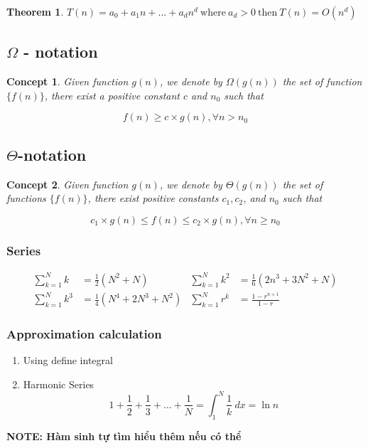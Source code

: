 \documentclass{article}
\newtheorem*{theorem}{Theorem}
\newtheorem*{concept}{Concept}
\begin{document}
    \begin{theorem}
        $T(n) = a_0 + a_1n + ... + a_d n^d \: \text{where} \: a_d > 0 \: \text{then} \: T(n) = O(n^d)$
    \end{theorem}

\subsection{$\Omega$ - notation}
\begin{concept}
    Given function $g(n)$, we denote by $\Omega(g(n))$ the set of function $\{f(n)\}$, there exist a positive constant $c$ and $n_0$ such that   
\end{concept}

\begin{equation}
    f(n) \geq c \times g(n), \forall n > n_0
\end{equation}
\subsection{$\Theta$-notation}
\begin{concept}
    Given function $g(n)$, we denote by $\Theta(g(n))$ the set of functions $\{f(n)\}$, there exist positive constants $c_1, c_2$, and $n_0$ such that
\end{concept}

\begin{equation}
    c_1\times g(n) \leq f(n) \leq c_2\times g(n), \forall n ≥ n_0    
\end{equation}
\subsubsection{Series}
\begin{align}
    \sum_{k = 1}^{N} k &= \frac{1}{2}(N^2 + N) &
    \sum_{k = 1}^{N} k^2 &= \frac{1}{6}(2n^3 + 3N^2 + N)\\
    \sum_{k = 1}^{N} k^3 &= \frac{1}{4}(N^4+ 2N^3 + N^2) &
    \sum_{k = 1}^{N} r^k &= \frac{1-r^{n+1}}{1-r}
\end{align}
\subsubsection{Approximation calculation}
\begin{enumerate}
    \item Using define integral
    \item Harmonic Series 
        \begin{equation}
            1 + \frac{1}{2} + \frac{1}{3} + \dots + \frac{1}{N} = \int_1^{N} \frac{1}{k}\ dx = \ln{n}
        \end{equation}
\end{enumerate}
\textbf{NOTE: Hàm sinh tự tìm hiểu thêm nếu có thể}
\end{document}
